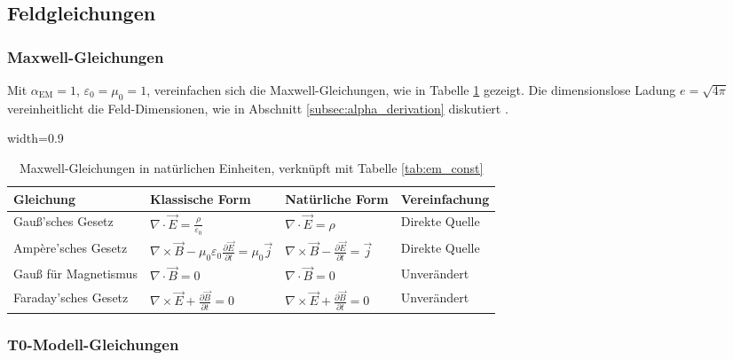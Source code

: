 \documentclass[12pt,a4paper]{article}
\newcommand{\alphaEM}{\alpha_{\text{EM}}}
\newcommand{\tablescale}{0.9}
\begin{document}
	\subsection{Feldgleichungen}
	\label{sec:field_equations}
	
	\subsubsection{Maxwell-Gleichungen}
	\label{subsec:maxwell}
	
	Mit \(\alphaEM = 1\), \(\varepsilon_0 = \mu_0 = 1\), vereinfachen sich die Maxwell-Gleichungen, wie in Tabelle \ref{tab:maxwell} gezeigt. Die dimensionslose Ladung \(e = \sqrt{4\pi}\) vereinheitlicht die Feld-Dimensionen, wie in Abschnitt \ref{subsec:alpha_derivation} diskutiert \cite{pascher_alpha_2025}.
	
	\begin{table}[htbp]
		\centering
		\begin{adjustbox}{width=\tablescale\textwidth}
			\begin{tabular}{llll}
				\toprule
				\textbf{Gleichung} & \textbf{Klassische Form} & \textbf{Natürliche Form} & \textbf{Vereinfachung} \\
				\midrule
				Gauß’sches Gesetz & \(\nabla \cdot \vec{E} = \frac{\rho}{\varepsilon_0}\) & \(\nabla \cdot \vec{E} = \rho\) & Direkte Quelle \\
				Ampère’sches Gesetz & \(\nabla \times \vec{B} - \mu_0 \varepsilon_0 \frac{\partial \vec{E}}{\partial t} = \mu_0 \vec{j}\) & \(\nabla \times \vec{B} - \frac{\partial \vec{E}}{\partial t} = \vec{j}\) & Direkte Quelle \\
				Gauß für Magnetismus & \(\nabla \cdot \vec{B} = 0\) & \(\nabla \cdot \vec{B} = 0\) & Unverändert \\
				Faraday’sches Gesetz & \(\nabla \times \vec{E} + \frac{\partial \vec{B}}{\partial t} = 0\) & \(\nabla \times \vec{E} + \frac{\partial \vec{B}}{\partial t} = 0\) & Unverändert \\
				\bottomrule
			\end{tabular}
		\end{adjustbox}
		\caption{Maxwell-Gleichungen in natürlichen Einheiten, verknüpft mit Tabelle \ref{tab:em_const}}
		\label{tab:maxwell}
	\end{table}
	
	\subsubsection{T0-Modell-Gleichungen}
	\label{subsec:t0_equations}
	
\end{document}

